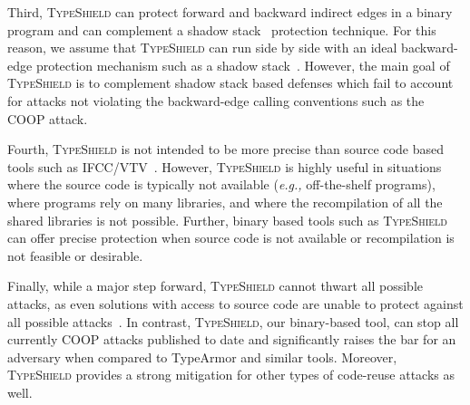 Third, \textsc{TypeShield} can protect forward and backward indirect edges 
in a binary program and can complement a shadow stack~\cite{dang:asiaccs} protection technique. For this reason, we assume that \textsc{TypeShield} can run side by side with an 
ideal backward-edge protection mechanism such as a shadow stack~\cite{conti:ccs}. However, the main goal of \textsc{TypeShield} is to complement 
shadow stack based defenses which fail to account for attacks not violating the backward-edge calling conventions such as the COOP attack.

Fourth, \textsc{TypeShield} is not intended to be more precise than source code based tools such as IFCC/VTV~\cite{vtv:tice}. However, 
\textsc{TypeShield} is highly useful in situations where the source code is typically not available (\textit{e.g.,} off-the-shelf programs), 
where programs rely on many libraries, and where the recompilation of all the shared libraries is not possible. 
Further, binary based tools such as \textsc{TypeShield} can offer precise protection when source code is not available or 
recompilation is not feasible or desirable.

Finally, while a major step forward, \textsc{TypeShield} cannot thwart all possible attacks, as even solutions with access to source 
code are unable to protect against all possible attacks~\cite{carlini:bending}. In contrast, \textsc{TypeShield}, our binary-based tool, 
can stop all currently COOP attacks published to date and significantly raises the bar for an adversary when compared to
TypeArmor and similar tools. Moreover, \textsc{TypeShield} provides a strong mitigation for other types of code-reuse attacks as well.
